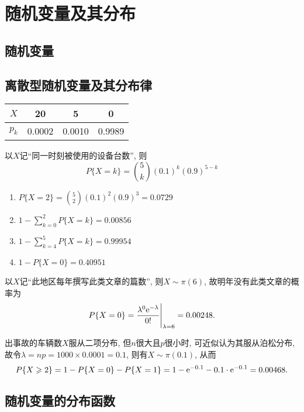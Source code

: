 \section{随机变量及其分布}
\subsection{随机变量}
\subsection{离散型随机变量及其分布律}
\begin{prob}
		\begin{tabular}{c|ccc}
		$X$ & 20 & 5 & 0\\
		\hline
		$p_k$ & 0.0002 & 0.0010 & 0.9989
		\end{tabular}
	\end{prob}
	\setcounter{prob}{5}
	\begin{prob}
		以$X$记``同一时刻被使用的设备台数'', 则
		\[
			P\{X=k\}={5\choose k}(0.1)^k(0.9)^{5-k}
		\]
		\begin{enumerate}
			\item
			$\displaystyle P\{X=2\}={5\choose 2}(0.1)^2(0.9)^{3}=0.0729$
			\item
			$\displaystyle 1-\sum_{k=0}^2P\{X=k\}=0.00856$
			\item
			$\displaystyle 1-\sum_{k=4}^5 P\{X=k\}=0.99954$
			\item
			$\displaystyle 1-P\{X=0\}=0.40951$
		\end{enumerate}
	\end{prob}
	\setcounter{prob}{10}
	\begin{prob}
		以$X$记``此地区每年撰写此类文章的篇数'', 则$X\sim \pi(6)$, 故明年没有此类文章的概率为
		\[
			P\{X=0\}=\frac{\lambda^0\mathrm{e}^{-\lambda}}{0!}\Bigg|_{\lambda=6}=0.00248.
		\]
	\end{prob}
	\setcounter{prob}{15}
	\begin{prob}
		出事故的车辆数$X$服从二项分布, 但$n$很大且$p$很小时, 可近似认为其服从泊松分布, 故令$\lambda =np=1000\times 0.0001=0.1$, 则有$X\sim\pi(0.1)$, 从而
		\[
			P\{X\geqslant 2\}=1-P\{X=0\}-P\{X=1\}=1-\mathrm{e}^{-0.1}-0.1\cdot\mathrm{e}^{-0.1}=0.00468.
		\]
	\end{prob}
	\subsection{随机变量的分布函数}
